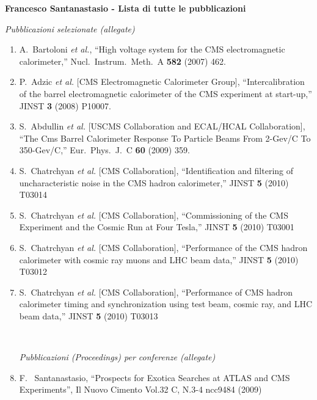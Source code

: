 \documentclass[10pt]{letter}
\begin{document}
{\large \sc \bf Francesco Santanastasio - Lista di tutte le pubblicazioni}

\begin{center} \textit{Pubblicazioni selezionate (allegate)} \end{center}

\begin{enumerate}
\item A.~Bartoloni {\it et al.},
  ``High voltage system for the CMS electromagnetic calorimeter,''
  Nucl.\ Instrum.\ Meth.\  A {\bf 582} (2007) 462.
\item P.~Adzic {\it et al.}  [CMS Electromagnetic Calorimeter Group],
  ``Intercalibration of the barrel electromagnetic calorimeter of the CMS
  experiment at start-up,'' JINST {\bf 3} (2008) P10007.
\item S.~Abdullin {\it et al.}  [USCMS Collaboration and ECAL/HCAL Collaboration],
  ``The Cms Barrel Calorimeter Response To Particle Beams From 2-Gev/C To 350-Gev/C,''
  Eur.\ Phys.\ J.\  C {\bf 60} (2009) 359.
\item S.~Chatrchyan {\it et al.}  [CMS Collaboration],
  ``Identification and filtering of uncharacteristic noise in the CMS hadron calorimeter,''
  JINST {\bf 5} (2010) T03014
\item S.~Chatrchyan {\it et al.}  [CMS Collaboration],
  ``Commissioning of the CMS Experiment and the Cosmic Run at Four Tesla,''
  JINST {\bf 5} (2010) T03001
\item S.~Chatrchyan {\it et al.}  [CMS Collaboration],
  ``Performance of the CMS hadron calorimeter with cosmic ray muons and LHC beam data,''
  JINST {\bf 5} (2010) T03012
\item S.~Chatrchyan {\it et al.}  [CMS Collaboration],
  ``Performance of CMS hadron calorimeter timing and synchronization using test beam, cosmic ray, and LHC beam data,''
  JINST {\bf 5} (2010) T03013

~\\
\begin{center} \textit{Pubblicazioni (Proceedings) per conferenze (allegate)} \\ 
\end{center}

\item F. ~Santanastasio, ``Prospects for Exotica Searches at ATLAS and CMS Experiments'', 
  Il Nuovo Cimento Vol.32 C, N.3-4 ncc9484 (2009)


\end{enumerate}
\end{document}
